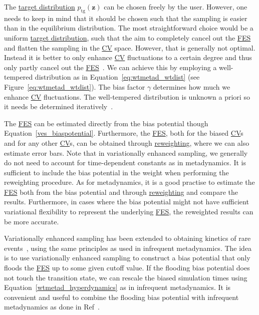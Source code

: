 \documentclass[9pt,review]{livecoms}
\newcommand{\vz}{\mathbf{z}}
\begin{document}
The \hyperlink{ref:targetdist}{target distribution} $p_{\mathrm{tg}}(\vz)$ can be chosen freely by the user. However, one needs to keep in mind that it should be chosen such that the sampling is easier than in the equilibrium distribution. The most straightforward choice would be a uniform \hyperlink{ref:targetdist}{target distribution}, such that the aim to completely cancel out the \hyperlink{ref:FES} {FES} and flatten the sampling in the \hyperlink{ref:CV} {CV} space. However, that is generally not optimal. Instead it is better to only enhance \hyperlink{ref:CV} {CV} fluctuations to a certain degree and thus only partly cancel out the \hyperlink{ref:FES} {FES}~\cite{Valsson-JCTC-2015}. We can achieve this by employing a well-tempered distribution as in Equation~\ref{eq:wtmetad_wtdist} (see Figure~\ref{eq:wtmetad_wtdist}). The bias factor $\gamma$ determines how much we enhance \hyperlink{ref:CV} {CV} fluctuations. The well-tempered distribution is unknown a priori so it needs be determined iteratively~\cite{Valsson-JCTC-2015}.

The \hyperlink{ref:FES} {FES} can be estimated directly from the bias potential though Equation~\ref{ves_biaspotential}. Furthermore, the \hyperlink{ref:FES} {FES}, both for the biased \hyperlink{ref:CV} {CV}s and for any other \hyperlink{ref:CV} {CV}s, can be obtained through \hyperlink{ref:Reweighting} {reweighting}, where we can also estimate error bars. Note that  in variationally enhanced sampling, we generally do not need to account for time-dependent constants as in metadynamics. It is sufficient to include the bias potential in the weight when performing the reweighting procedure. As for metadynamics, it is a good practise to estimate the \hyperlink{ref:FES} {FES} both from the bias potential and through \hyperlink{ref:Reweighting} {reweighting} and compare the results. Furthermore, in cases where the bias potential might not have sufficient variational flexibility to represent the underlying \hyperlink{ref:FES} {FES}, the reweighted results can be more accurate.

Variationally enhanced sampling has been extended to obtaining kinetics of rare events~\cite{McCarty-PRL-2015}, using the same principles as used in infrequent metadynamics. The idea is to use variationally enhanced sampling to construct a bias potential that only floods the \hyperlink{ref:FES} {FES} up to some given cutoff value. If the flooding bias potential does not touch the transition state, we can rescale the biased simulation times using Equation~\ref{wtmetad_hyperdynamics} as in infrequent metadynamics. It is convenient and useful to combine the flooding bias potential with infrequent metadynamics as done in Ref~\cite{Palazzesi2017_JPCL}.
\end{document}
